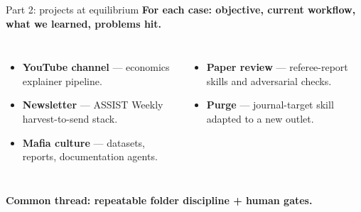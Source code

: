 
\begin{frame}{Part 2: projects at equilibrium}
  \small
  \textbf{For each case: objective, current workflow, what we learned, problems hit.}
  \vspace{0.35cm}
  \begin{columns}[T,onlytextwidth]
      \begin{itemize}\setlength\itemsep{0.32em}
        \item \textbf{YouTube channel} --- economics explainer pipeline.
        \item \textbf{Newsletter} --- ASSIST Weekly harvest-to-send stack.
        \item \textbf{Mafia culture} --- datasets, reports, documentation agents.
      \end{itemize}
      \begin{itemize}\setlength\itemsep{0.32em}
        \item \textbf{Paper review} --- referee-report skills and adversarial checks.
        \item \textbf{Purge} --- journal-target skill adapted to a new outlet.
      \end{itemize}
  \end{columns}
  \vspace{0.35cm}
  \begin{center}{\color{deepblue}\bfseries Common thread: repeatable folder discipline + human gates.}\end{center}
\end{frame}
